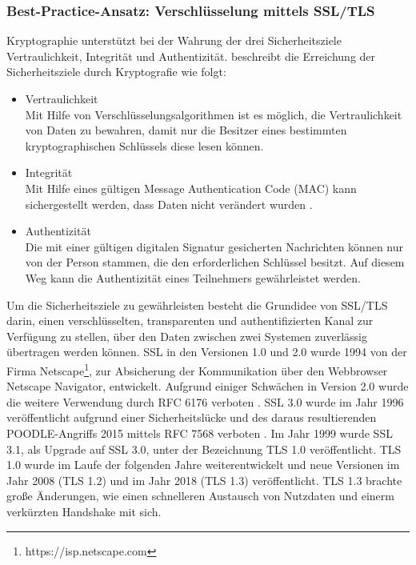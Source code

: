 \subsubsection{Best-Practice-Ansatz: Verschlüsselung mittels SSL/TLS}
Kryptographie unterstützt bei der Wahrung der drei Sicherheitsziele \glqq{}Vertraulichkeit\grqq{}, \glqq{}Integrität\grqq{} und \glqq{}Authentizität\grqq{}. \textcite{SchwenkJörg2020SuKi} beschreibt die Erreichung der Sicherheitsziele durch Kryptografie wie folgt:
\begin{itemize}
    \item Vertraulichkeit\\
    Mit Hilfe von Verschlüsselungsalgorithmen ist es möglich, die Vertraulichkeit von Daten zu bewahren, damit nur die Besitzer eines bestimmten kryptographischen Schlüssels diese lesen können.
    \item Integrität\\
    Mit Hilfe eines gültigen \glqq{}Message Authentication Code\grqq{} (MAC) kann sichergestellt werden, dass Daten nicht verändert wurden \autocite{datatracker}. 
    \item Authentizität\\
    Die mit einer gültigen digitalen Signatur gesicherten Nachrichten können nur von der Person stammen, die den erforderlichen Schlüssel besitzt. Auf diesem Weg kann die Authentizität eines Teilnehmers gewährleistet werden. 
\end{itemize}
\bigbreak
Um die Sicherheitsziele zu gewährleisten besteht die Grundidee von SSL/TLS darin, einen verschlüsselten, transparenten und authentifizierten Kanal zur Verfügung zu stellen, über den Daten zwischen zwei Systemen zuverlässig übertragen werden können. 
\bigbreak
SSL in den Versionen 1.0 und 2.0 wurde 1994 von der Firma \glqq{}Netscape\footnote{https://isp.netscape.com}\grqq{}, zur Absicherung der Kommunikation über den Webbrowser \glqq{}Netscape Navigator\grqq{}, entwickelt. Aufgrund einiger Schwächen in Version 2.0 wurde die weitere Verwendung durch \glqq{}RFC 6176\grqq{} verboten \autocite{RFC6176}. SSL 3.0 wurde im Jahr 1996 veröffentlicht aufgrund einer Sicherheitslücke und des daraus resultierenden \glqq{}POODLE-Angriffs\grqq{} 2015 mittels \glqq{}RFC 7568\grqq{} verboten \autocite{RFC7568} \autocite{TA14-290A}. Im Jahr 1999 wurde SSL 3.1, als Upgrade auf SSL 3.0, unter der Bezeichnung TLS 1.0 veröffentlicht. TLS 1.0 wurde im Laufe der folgenden Jahre weiterentwickelt und neue Versionen im Jahr 2008 (TLS 1.2) und im Jahr 2018 (TLS 1.3) veröffentlicht. TLS 1.3 brachte große Änderungen, wie einen schnelleren Austausch von Nutzdaten und einerm verkürzten Handshake mit sich. \autocite{SchwenkJörg2020SuKi}
